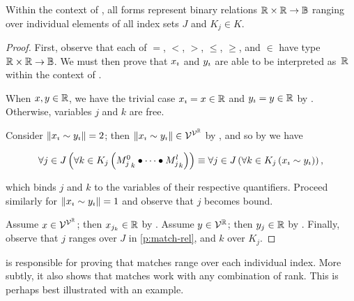 \begin{theorem}
  Within the context of ,
    all  forms represent binary relations
      $\mathbb{R}\times\mathbb{R}\rightarrow\mathbb{B}$
    ranging over individual elements of all index sets $J$ and $K_j\in K$.
\end{theorem}
\begin{proof}
  First,
    observe that each of $=$, $<$, $>$, $\leq$, $\geq$, and $\in$
    have type $\mathbb{R}\times\mathbb{R}\rightarrow\mathbb{B}$.
  We must then prove that ${x}_{\imath}$ and ${y}_{\imath}$ are able to be
    interpreted as~$\mathbb{R}$ within the context of .

  When $x,y\in\mathbb{R}$,
    we have the trivial case ${x}_{\imath}=x\in\mathbb{R}$ and ${y}_{\imath}=y\in\mathbb{R}$
    by .
  Otherwise,
    variables $j$ and $k$ are free.

  Consider $\|{x}_{\imath} \sim {y}_{\imath}\| = 2$;
    then $\|{x}_{\imath} \sim {y}_{\imath}\| \in\mathcal{V}^{\mathcal{V}^{\mathbb{R}}}$ by ,
      and so by  we have

  \begin{equation}\label{p:match-rel}
    \Forall{j\in J}{\Forall{k\in K_j}{\cpredmatseq}}
      \equiv
      \Forall{j\in J}{\Forall{k\in K_j}{\varsub x \sim \varsub y}},
  \end{equation}

  \noindent
  which binds $j$ and $k$ to the variables of their respective quantifiers.
  Proceed similarly for $\|{x}_{\imath} \sim {y}_{\imath}\| = 1$ and observe that
    $j$ becomes bound.

  Assume $x\in\mathcal{V}^{\mathcal{V}^{\mathbb{R}}}$;
    then $x_{j_k}\in\mathbb{R}$ by .
  Assume $y\in\mathcal{V}^{\mathbb{R}}$;
    then $y_j\in\mathbb{R}$ by .
  Finally,
    observe that $j$ ranges over $J$ in \ref{p:match-rel},
      and $k$ over $K_j$.
\end{proof}

 is responsible for proving that matches range over each
  individual index.
More subtly,
  it also shows that matches work with any combination of rank.
This is perhaps best illustrated with an example.

